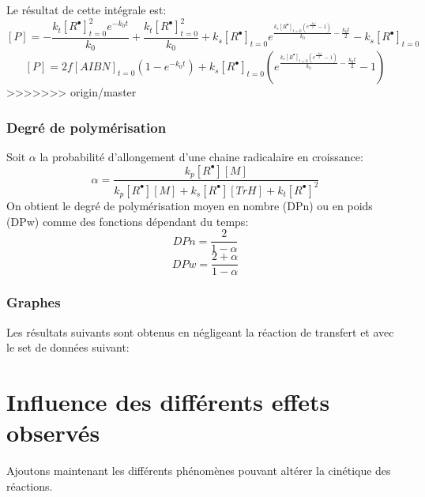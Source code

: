 \documentclass[a4paper,oneside,12pt]{article}
\begin{document}
Le résultat de cette intégrale est:
$$[P]=-\frac{k_t[R^{\bullet}]_{t=0}^2e^{-k_0t}}{k_0}+\frac{k_t[R^{\bullet}]_{t=0}^2}{k_0}+k_s[R^{\bullet}]_{t=0}e^{\frac{k_s[R^{\bullet}]_{t=0}(e^{\frac{-k_0t}{2}}-1)}{k_0}-\frac{k_0t}{2}}-k_s[R^{\bullet}]_{t=0}$$
$$[P]=2f[AIBN]_{t=0}(1-e^{-k_0t})+k_s[R^{\bullet}]_{t=0}(e^{\frac{k_s[R^{\bullet}]_{t=0}(e^{\frac{-k_0t}{2}}-1)}{k_0}-\frac{k_0t}{2}}-1)$$
>>>>>>> origin/master

\section{Degré de polymérisation}
Soit $\alpha$ la probabilité d'allongement d'une chaine radicalaire en croissance: 
$$\alpha=\frac{k_p[R^{\bullet}][M]}{k_p[R^{\bullet}][M]+k_s[R^{\bullet}][TrH]+k_t[R^{\bullet}]^2}$$
On obtient le degré de polymérisation moyen en nombre (DPn) ou en poids (DPw) comme des fonctions dépendant du temps:
$$DPn=\frac{2}{1-\alpha}$$
$$DPw=\frac{2+\alpha}{1-\alpha}$$

\section{Graphes}
Les résultats suivants sont obtenus en négligeant la réaction de transfert et avec le set de données suivant:


\part{Influence des différents effets observés}

Ajoutons maintenant les différents phénomènes pouvant altérer la cinétique des réactions.\\
\end{document}

